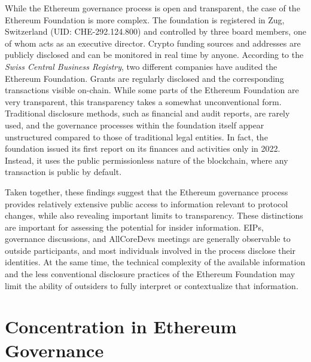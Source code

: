 \documentclass[No]{AEA}
\begin{document}
While the Ethereum governance process is open and transparent, the case of the Ethereum Foundation is more complex. The foundation is registered in Zug, Switzerland (UID: CHE-292.124.800) and controlled by three board members, one of whom acts as an executive director. Crypto funding sources and addresses are publicly disclosed and can be monitored in real time by anyone. According to the \emph{Swiss Central Business Registry}, two different companies have audited the Ethereum Foundation. Grants are regularly disclosed and the corresponding transactions visible on-chain. 
While some parts of the Ethereum Foundation are very transparent, this transparency takes a somewhat unconventional form. Traditional disclosure methods, such as financial and audit reports, are rarely used, and the governance processes within the foundation itself appear unstructured compared to those of traditional legal entities. 
In fact, the foundation issued its first report on its finances and activities only in 2022. Instead, it uses the public permissionless nature of the blockchain, where any transaction is public by default. 


Taken together, these findings suggest that the Ethereum governance process provides relatively extensive public access to information relevant to protocol changes, while also revealing important limits to transparency. These distinctions are important for assessing the potential for insider information. EIPs, governance discussions, and AllCoreDevs meetings are generally observable to outside participants, and most individuals involved in the process disclose their identities. At the same time, the technical complexity of the available information and the less conventional disclosure practices of the Ethereum Foundation may limit the ability of outsiders to fully interpret or contextualize that information. 


\section{Concentration in Ethereum Governance} \label{sec:concentration}
\end{document}
